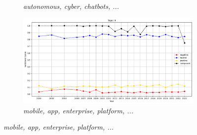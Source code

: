 \begin{figure}[H]
\begin{subfigure}[b]{0.45\textwidth}
    \caption{\emph{autonomous, cyber, chatbots, ...}}
    \label{fig:sentiments-topic-3}
  \end{subfigure}
  \hfill
  \begin{subfigure}[b]{0.45\textwidth}
    \includegraphics[width=\textwidth]{figures/sentiments/topic-4.png}
    \caption{\emph{mobile, app, enterprise, platform, ...}}
    \label{fig:sentiments-topic-4}
  \end{subfigure}


\end{figure}
